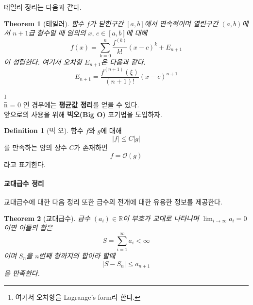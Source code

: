\documentclass[a4paper, 11pt]{report}
\newtheorem{theorem}{Theorem}[chapter]
\theoremstyle{definition}
\newtheorem*{defn}{Definition}
\begin{document}
테일러 정리는 다음과 같다.
\begin{theorem}[테일러]
    함수 $f$가 닫힌구간 $[a, b]$에서 연속적이며 열린구간 $(a, b)$에서 $n+1$급 함수일 때 임의의 $x,\,c \in [a, b]$에 대해
    \begin{equation}
        f(x) = \sum_{k=0}^{n}\frac{f^{(k)}}{k!}(x-c)^k + E_{n+1}
    \end{equation}  
    이 성립한다. 여기서 오차항 $E_{n+1}$은 다음과 같다.
    \begin{equation}
        E_{n+1} = \frac{f^{(n+1)}(\xi)}{(n+1)!}(x-c)^{n+1}
    \end{equation}  
\end{theorem}\footnote{여기서 오차항을 Lagrange's form라 한다.} \\
n = 0 인 경우에는 \textbf{평균값 정리}를 얻을 수 있다. \\
앞으로의 사용을 위해 \textbf{빅오(Big O)} 표기법을 도입하자.
\begin{defn}[빅 오]
    함수 $f$와 $g$에 대해
    \[
        |f|\leq C|g|
    \]
    를 만족하는 양의 상수 $C$가 존재하면 
    \[ 
        f = \mathcal{O}(g)
    \]
    라고 표기한다.
\end{defn}
\paragraph{교대급수 정리} 교대급수에 대한 다음 정리 또한 급수의 전개에 대한 유용한 정보를 제공한다. 

\begin{theorem}[교대급수]
    급수 $(a_i) \in \mathbb{R}$이 부호가 교대로 나타나며 
    $\lim_{i \to \infty}a_i = 0$이면 이들의 합은
    \[
        S = \sum_{i=1}^{\infty}a_i < \infty
    \]
    이며 $S_n$을 $n$번째 항까지의 합이라 할때 
    \[
        |S-S_n| \leq a_{n+1}
    \]
    을 만족한다.
\end{theorem}
\end{document}
